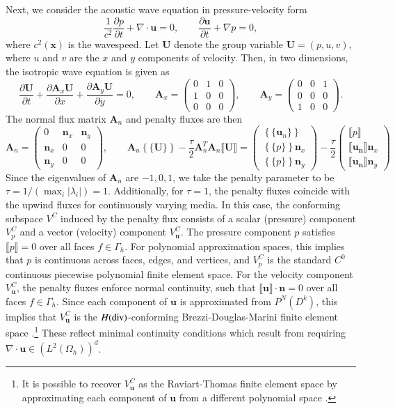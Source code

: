 \documentclass[preprint,10pt]{elsarticle}
\newcommand{\pd}[2]{\frac{\partial#1}{\partial#2}}
\newcommand{\LRp}[1]{\left( #1 \right)}
\newcommand{\LRc}[1]{\left\{ #1 \right\}}
\newcommand{\Grad} {\ensuremath{\nabla}}
\newcommand{\Div} {\ensuremath{\nabla\cdot}}
\newcommand{\jump}[1] {\ensuremath{\llbracket#1\rrbracket}}
\newcommand{\avg}[1] {\ensuremath{\LRc{\!\{#1\}\!}}}
\newcommand{\Gh}{\Gamma_h}
\newcommand{\Oh}{\Omega_h}
\begin{document}
Next, we consider the acoustic wave equation in pressure-velocity form
\[
\frac{1}{c^2}\pd{p}{t} +\Div \bm{u}=0, \qquad \pd{\bm{u}}{t} + \Grad p = 0,
\]
where $c^2(\bm{x})$ is the wavespeed.  Let $\bm{U}$ denote the group variable $\bm{U} = (p,u,v)$, where $u$ and $v$ are the $x$ and $y$ components of velocity.  Then, in two dimensions, the isotropic wave equation is given as
\[
\pd{\bm{U}}{t} + \pd{\bm{A}_x\bm{U}}{x} + \pd{\bm{A}_y\bm{U}}{y} = 0, \qquad \bm{A}_x = 
\left(\begin{array}{ccc}
0 & 1 & 0\\
1 & 0 & 0\\
0 & 0 & 0
\end{array}
\right), \qquad 
\bm{A}_y = 
\left(\begin{array}{ccc}
0 & 0 & 1\\
0 & 0 & 0\\
1 & 0 & 0
\end{array}
\right).
\]
The normal flux matrix $\bm{A}_n$ and penalty fluxes are then
\[
\bm{A}_n = 
\left(\begin{array}{ccc}
0 & \bm{n}_x & \bm{n}_y\\
\bm{n}_x & 0 & 0\\
\bm{n}_y & 0 & 0
\end{array}
\right)
,
\qquad
\bm{A}_n \avg{\bm{U}} - \frac{\tau}{2}\bm{A}_n^T\bm{A}_n \jump{\bm{U}} = \left(\begin{array}{c}
\avg{\bm{u}_n}\\
\avg{p }\bm{n}_x\\
\avg{p }\bm{n}_y
\end{array}
\right) - 
\frac{\tau}{2}\left(\begin{array}{c}
\jump{p}\\
\jump{\bm{u_n}}\bm{n}_x\\
\jump{\bm{u_n}}\bm{n}_y
\end{array}
\right)
\]
Since the eigenvalues of $\bm{A}_n$ are $-1,0,1$, we take the penalty parameter to be $\tau = 1 / (\max_i |\lambda_i|) = 1$.   Additionally, for $\tau = 1$, the penalty fluxes coincide with the upwind fluxes for continuously varying media.  In this case, the conforming subspace $V^{C}$ induced by the penalty flux consists of a scalar (pressure) component $V^C_p$ and a vector (velocity) component $V^C_{\bm{u}}$.  The pressure component $p$ satisfies $\jump{p} = 0$ over all faces $f\in \Gh$.  For polynomial approximation spaces, this implies that $p$ is continuous across faces, edges, and vertices, and $V^C_p$ is the standard $C^0$ continuous piecewise polynomial finite element space.  For the velocity component $V_{\bm{u}}^C$, the penalty fluxes enforce normal continuity, such that $\jump{\bm{u}}\cdot \bm{n} = 0$ over all faces $f \in \Gh$.  Since each component of $\bm{u}$ is approximated from $P^N(D^k)$, this implies that $V^C_{\bm{u}}$ is the $H({\rm div})$-conforming Brezzi-Douglas-Marini finite element space \cite{brezzi1985two,boffi2013mixed}.\footnote{It is possible to recover $V^C_{\bm{u}}$ as the Raviart-Thomas finite element space by approximating each component of $\bm{u}$ from a different polynomial space \cite{kirby2004algorithm}.}   These reflect minimal continuity conditions which result from requiring $\Div \bm{u} \in \LRp{L^2\LRp{\Oh}}^d$.
\end{document}

